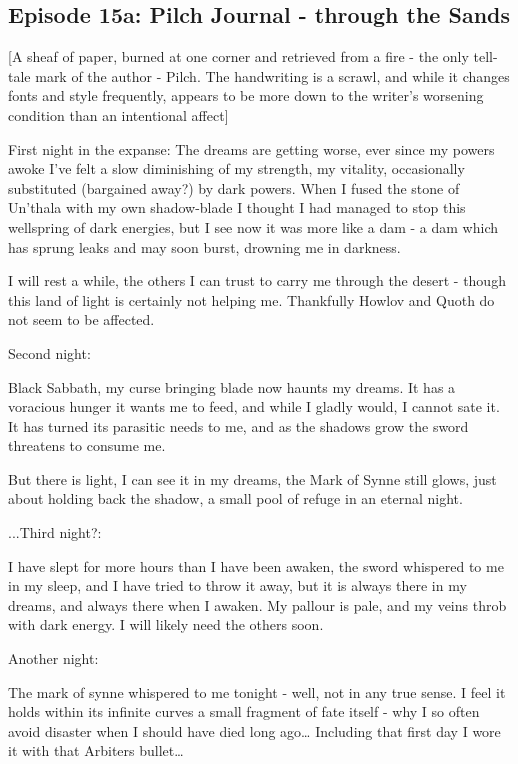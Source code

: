 \subsection{Episode 15a: Pilch Journal - through the Sands}

[A sheaf of paper, burned at one corner and retrieved from a fire - the only tell-tale mark of the author - Pilch. The handwriting is a scrawl, and while it changes fonts and style frequently, appears to be more down to the writer’s worsening condition than an intentional affect]\medskip

First night in the expanse: The dreams are getting worse, ever since my powers awoke I’ve felt a slow diminishing of my strength, my vitality, occasionally substituted (bargained away?) by dark powers. When I fused the stone of Un’thala with my own shadow-blade I thought I had managed to stop this wellspring of dark energies, but I see now it was more like a dam - a dam which has sprung leaks and may soon burst, drowning me in darkness.\medskip

I will rest a while, the others I can trust to carry me through the desert - though this land of light is certainly not helping me. Thankfully Howlov and Quoth do not seem to be affected.\medskip

Second night:\medskip

Black Sabbath, my curse bringing blade now haunts my dreams. It has a voracious hunger it wants me to feed, and while I gladly would, I cannot sate it. It has turned its parasitic needs to me, and as the shadows grow the sword threatens to consume me.\medskip

But there is light, I can see it in my dreams, the Mark of Synne still glows, just about holding back the shadow, a small pool of refuge in an eternal night.\medskip

...Third night?:\medskip

I have slept for more hours than I have been awaken, the sword whispered to me in my sleep, and I have tried to throw it away, but it is always there in my dreams, and always there when I awaken. My pallour is pale, and my veins throb with dark energy. I will likely need the others soon.\medskip

Another night:\medskip

The mark of synne whispered to me tonight - well, not in any true sense. I feel it holds within its infinite curves a small fragment of fate itself - why I so often avoid disaster when I should have died long ago… Including that first day I wore it with that Arbiters bullet…\medskip

